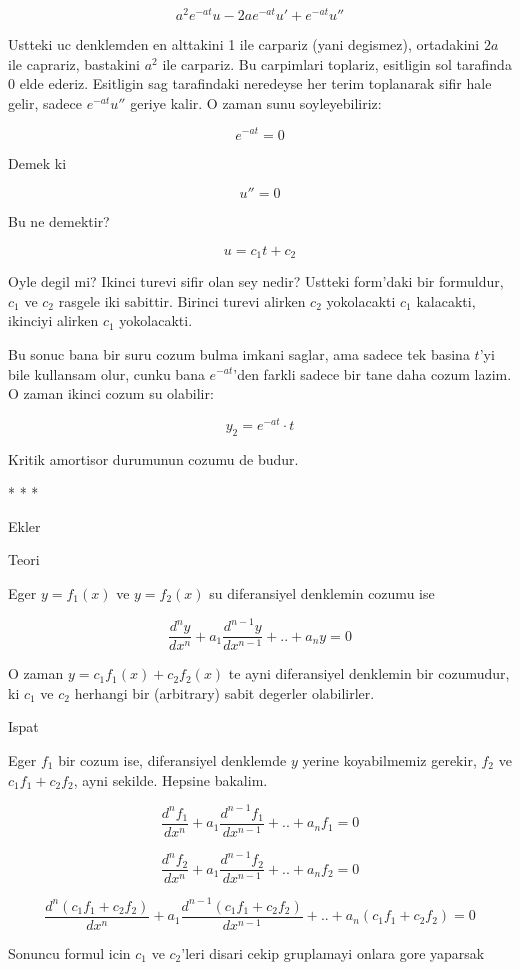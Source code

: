 \documentclass[12pt,fleqn]{article}\usepackage{../common}
\begin{document}
\[ a^2e^{-at}u - 2ae^{-at}u' + e^{-at}u'' \]

Ustteki uc denklemden en alttakini 1 ile carpariz (yani degismez),
ortadakini $2a$ ile caprariz, bastakini $a^2$ ile carpariz. Bu carpimlari
toplariz, esitligin sol tarafinda 0 elde ederiz. Esitligin sag tarafindaki
neredeyse her terim toplanarak sifir hale gelir, sadece $e^{-at}u''$ geriye
kalir. O zaman sunu soyleyebiliriz:

\[ e^{-at} = 0 \]

Demek ki 

\[ u'' = 0 \]

Bu ne demektir?

\[ u = c_1t + c_2 \]

Oyle degil mi? Ikinci turevi sifir olan sey nedir? Ustteki form'daki bir
formuldur, $c_1$ ve $c_2$ rasgele iki sabittir. Birinci turevi alirken $c_2$
yokolacakti $c_1$ kalacakti, ikinciyi alirken $c_1$ yokolacakti. 

Bu sonuc bana bir suru cozum bulma imkani saglar, ama sadece tek basina
$t$'yi bile kullansam olur, cunku bana $e^{-at}$'den farkli sadece bir tane
daha cozum lazim. O zaman ikinci cozum su olabilir:

\[ y_2 = e^{-at} \cdot t \]

Kritik amortisor durumunun cozumu de budur. 

* * * 

Ekler

Teori

Eger $y=f_1(x)$ ve $y=f_2(x)$ su diferansiyel denklemin cozumu ise

\[ \frac{d^ny}{dx^n} + a_1 \frac{d^{n-1}y}{dx^{n-1}} + .. + a_n y = 0\]


O zaman $y=c_1f_1(x) + c_2f_2(x)$ te ayni diferansiyel denklemin bir
cozumudur, ki $c_1$ ve $c_2$ herhangi bir (arbitrary) sabit degerler olabilirler.

Ispat

Eger $f_1$ bir cozum ise, diferansiyel denklemde $y$ yerine koyabilmemiz
gerekir, $f_2$ ve $c_1f_1 + c_2f_2$, ayni sekilde. Hepsine bakalim.

\[ \frac{d^nf_1}{dx^n} + a_1 \frac{d^{n-1}f_1}{dx^{n-1}} + .. + a_n f_1 = 0\]

\[ \frac{d^nf_2}{dx^n} + a_1 \frac{d^{n-1}f_2}{dx^{n-1}} + .. + a_n f_2 = 0\]

\[ \frac{d^n(c_1f_1 + c_2f_2)}{dx^n} + 
a_1 \frac{d^{n-1}(c_1f_1 + c_2f_2)}{dx^{n-1}} + .. + 
a_n (c_1f_1 + c_2f_2) = 0
\]

Sonuncu formul icin $c_1$ ve $c_2$'leri disari cekip gruplamayi onlara gore
yaparsak
\end{document}
